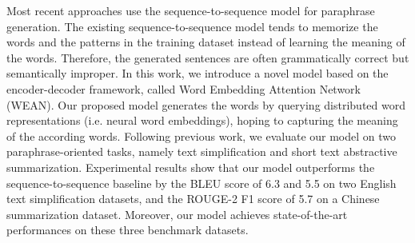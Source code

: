 Most recent approaches use the sequence-to-sequence model for paraphrase generation. The existing sequence-to-sequence model tends to memorize the words and the patterns in the training dataset instead of learning the meaning of the words. Therefore, the generated sentences are often grammatically correct but semantically improper. In this work, we introduce a novel model based on the encoder-decoder framework, called Word Embedding Attention Network (WEAN). Our proposed model generates the words by querying distributed word representations (i.e. neural word embeddings), hoping to capturing the meaning of the according words. Following previous work, we evaluate our model on two paraphrase-oriented tasks, namely text simplification and short text abstractive summarization. Experimental results show that our model outperforms the sequence-to-sequence baseline by the BLEU score of 6.3 and 5.5 on two English text simplification datasets, and the ROUGE-2 F1 score of 5.7 on a Chinese summarization dataset. Moreover, our model achieves state-of-the-art performances on these three benchmark datasets.
